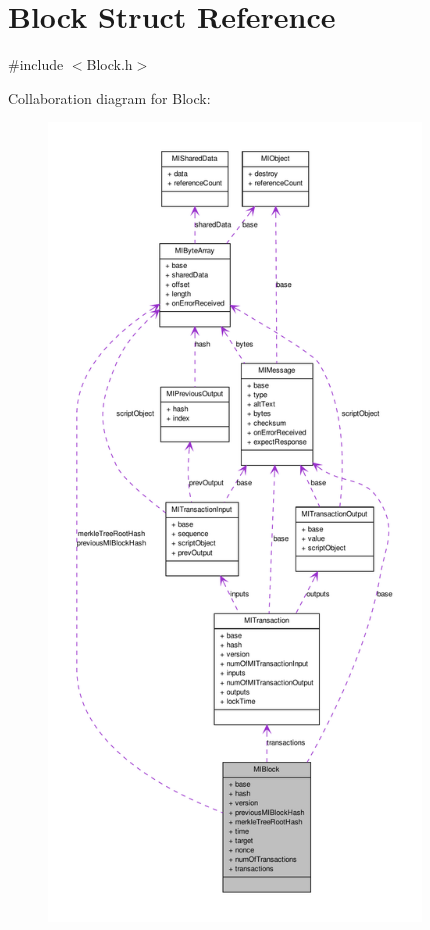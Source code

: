 \hypertarget{struct_m_i_block}{
\section{Block Struct Reference}
\label{struct_m_i_block}
}


{\ttfamily \#include $<$Block.h$>$}



Collaboration diagram for Block:
\nopagebreak
\begin{figure}[H]
\begin{center}
\leavevmode
\includegraphics[height=600pt]{struct_m_i_block__coll__graph}
\end{center}
\end{figure}
